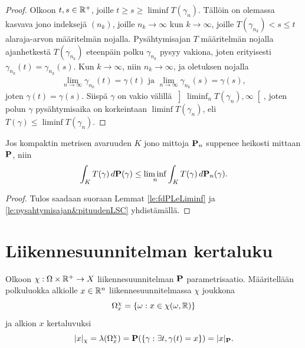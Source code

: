 \documentclass[12pt,oneside,a4paper]{amsbook} %
\begin{document}
\begin{proof}
    Olkoon $t, s \in \Rp$, joille $t \ge s \ge \liminf T(\gamma_n)$. Tällöin on olemassa kasvava jono indeksejä $(n_k)$, joille $n_k \to \infty$ kun $k \to \infty$, joille $T(\gamma_{n_k}) < s \le t$ alaraja-arvon määritelmän nojalla. Pysähtymisajan $T$ määritelmän nojalla ajanhetkestä $T(\gamma_{n_k})$ eteenpäin polku $\gamma_{n_k}$ pysyy vakiona, joten erityisesti $\gamma_{n_k}(t) = \gamma_{n_k}(s)$. Kun $k \to \infty$, niin $n_k \to \infty$, ja oletuksen nojalla
    \begin{align*}
        \lim_{n\to \infty} \gamma_{n_k}(t) = \gamma(t) \text{ ja } \lim_{n\to \infty} \gamma_{n_k}(s) = \gamma(s),
    \end{align*}
    joten $\gamma(t) = \gamma(s)$. Siispä $\gamma$ on vakio välillä $\left]\liminf_n T(\gamma_n), \infty\right[$, joten polun $\gamma$ pysähtymisaika on korkeintaan $\liminf T(\gamma_n)$, eli $T(\gamma) \le \liminf T(\gamma_n)$.
    
\end{proof}

\begin{corollary}\label{le:keskipysahtymisajan&pituudenLSC}
    Jos kompaktin metrisen avaruuden $K$ jono mittoja $\P_n$ suppenee heikosti mittaan $\P$, niin 
    \begin{equation*}
        \int_K T(\gamma) \, d\P(\gamma) \le \liminf_n \int_K T(\gamma) \, d\P_n(\gamma).
    \end{equation*}
\end{corollary}
\begin{proof}
    Tulos saadaan suoraan Lemmat \ref{le:fdPLeLiminf} ja \ref{le:pysahtymisajan&pituudenLSC} yhdistämällä.
\end{proof}

\section{Liikennesuunnitelman kertaluku}

\begin{definition}
Olkoon $\chi : \Omega \times \R^+ \to X$ liikennesuunnitelman $\P$ parametrisaatio. Määritellään polkuluokka alkiolle $x\in \R^n$ liikennesuunnitelmassa $\chi$ joukkona
\begin{equation*}
    \Omega_x^\chi = \{\omega : x \in \chi(\omega, \R)\}
\end{equation*}
ja alkion $x$ kertaluvuksi
    \begin{equation*}
        |x|_\chi = \lambda(\Omega_x^\chi) = \P(\{\gamma : \exists t, \gamma(t) = x\}) = |x|_\P.
    \end{equation*}
\end{definition}
\end{document}
